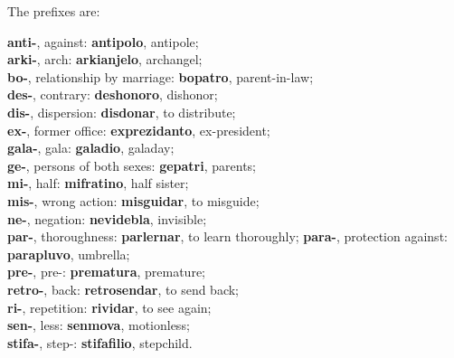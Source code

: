 \begin{center}The prefixes are:\end{center}
\textbf{anti-}, against: \textbf{antipolo}, antipole;  \\
\textbf{arki-}, arch: \textbf{arkianjelo}, archangel; \\
\textbf{bo-}, relationship by marriage: \textbf{bopatro}, parent-in-law; \\
\textbf{des-}, contrary: \textbf{deshonoro}, dishonor; \\ 
\textbf{dis-}, dispersion: \textbf{disdonar}, to distribute; \\ 
\textbf{ex-}, former office: \textbf{exprezidanto}, ex-president; \\ 
\textbf{gala-}, gala: \textbf{galadio}, galaday; \\ 
\textbf{ge-}, persons of both sexes: \textbf{gepatri}, parents; \\ 
\textbf{mi-}, half: \textbf{mifratino}, half sister; \\ 
\textbf{mis-}, wrong action: \textbf{misguidar}, to misguide; \\ 
\textbf{ne-}, negation: \textbf{nevidebla}, invisible; \\ 
\textbf{par-}, thoroughness: \textbf{parlernar}, to learn thoroughly;
\textbf{para-}, protection against: \textbf{parapluvo}, umbrella; \\ 
\textbf{pre-}, pre-: \textbf{prematura}, premature; \\ 
\textbf{retro-}, back: \textbf{retrosendar}, to send back; \\ 
\textbf{ri-}, repetition: \textbf{rividar}, to see again; \\ 
\textbf{sen-}, less: \textbf{senmova}, motionless; \\ 
\textbf{stifa-}, step-: \textbf{stifafilio}, stepchild. 

